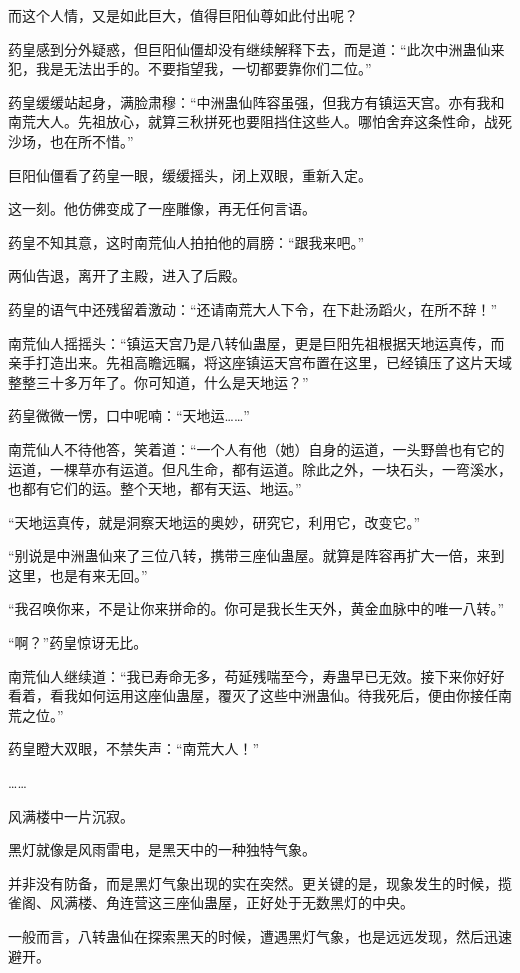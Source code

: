\begin{this_body}
而这个人情，又是如此巨大，值得巨阳仙尊如此付出呢？

药皇感到分外疑惑，但巨阳仙僵却没有继续解释下去，而是道：“此次中洲蛊仙来犯，我是无法出手的。不要指望我，一切都要靠你们二位。”

药皇缓缓站起身，满脸肃穆：“中洲蛊仙阵容虽强，但我方有镇运天宫。亦有我和南荒大人。先祖放心，就算三秋拼死也要阻挡住这些人。哪怕舍弃这条性命，战死沙场，也在所不惜。”

巨阳仙僵看了药皇一眼，缓缓摇头，闭上双眼，重新入定。

这一刻。他仿佛变成了一座雕像，再无任何言语。

药皇不知其意，这时南荒仙人拍拍他的肩膀：“跟我来吧。”

两仙告退，离开了主殿，进入了后殿。

药皇的语气中还残留着激动：“还请南荒大人下令，在下赴汤蹈火，在所不辞！”

南荒仙人摇摇头：“镇运天宫乃是八转仙蛊屋，更是巨阳先祖根据天地运真传，而亲手打造出来。先祖高瞻远瞩，将这座镇运天宫布置在这里，已经镇压了这片天域整整三十多万年了。你可知道，什么是天地运？”

药皇微微一愣，口中呢喃：“天地运……”

南荒仙人不待他答，笑着道：“一个人有他（她）自身的运道，一头野兽也有它的运道，一棵草亦有运道。但凡生命，都有运道。除此之外，一块石头，一弯溪水，也都有它们的运。整个天地，都有天运、地运。”

“天地运真传，就是洞察天地运的奥妙，研究它，利用它，改变它。”

“别说是中洲蛊仙来了三位八转，携带三座仙蛊屋。就算是阵容再扩大一倍，来到这里，也是有来无回。”

“我召唤你来，不是让你来拼命的。你可是我长生天外，黄金血脉中的唯一八转。”

“啊？”药皇惊讶无比。

南荒仙人继续道：“我已寿命无多，苟延残喘至今，寿蛊早已无效。接下来你好好看着，看我如何运用这座仙蛊屋，覆灭了这些中洲蛊仙。待我死后，便由你接任南荒之位。”

药皇瞪大双眼，不禁失声：“南荒大人！”

……

风满楼中一片沉寂。

黑灯就像是风雨雷电，是黑天中的一种独特气象。

并非没有防备，而是黑灯气象出现的实在突然。更关键的是，现象发生的时候，揽雀阁、风满楼、角连营这三座仙蛊屋，正好处于无数黑灯的中央。

一般而言，八转蛊仙在探索黑天的时候，遭遇黑灯气象，也是远远发现，然后迅速避开。


\end{this_body}
